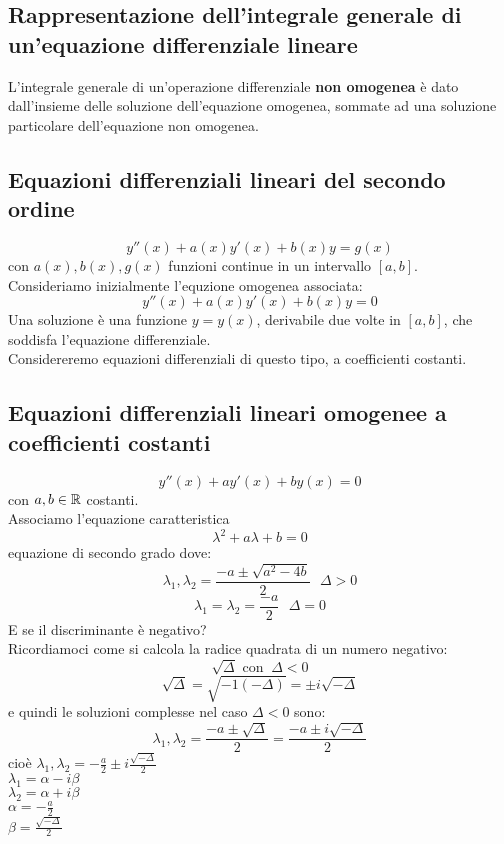 \documentclass[../main.tex]{subfiles}
\begin{document}
\subsection{Rappresentazione dell'integrale generale di un'equazione differenziale lineare}
L'integrale generale di un'operazione differenziale \textbf{non omogenea} è
dato dall'insieme delle soluzione dell'equazione omogenea, sommate ad una
soluzione particolare dell'equazione non omogenea.

\subsection{Equazioni differenziali lineari del secondo ordine}
\[
    y''(x) + a(x)y'(x) + b(x)y = g(x)
\]
con $a(x), b(x), g(x)$ funzioni continue in un intervallo $[a, b]$. \\
Consideriamo inizialmente l'equzione omogenea associata:
\[
    y''(x) + a(x)y'(x) + b(x)y = 0
\]
Una soluzione è una funzione $y = y(x)$, derivabile due volte in $[a, b]$, che
soddisfa l'equazione differenziale.\\ Considereremo equazioni differenziali di
questo tipo, a coefficienti costanti.

\subsection{Equazioni differenziali lineari omogenee a coefficienti costanti}
\[
    y''(x) + ay'(x) + by(x) = 0
\]
con $a, b \in \mathbb{R}$ costanti.\\ Associamo l'equazione caratteristica
\[
    \lambda^2 + a\lambda + b = 0
\]
equazione di secondo grado dove:
\[
    \lambda_1, \lambda_2 = \frac{-a \pm \sqrt{a^2 - 4b}}{2} \ \ \ \Delta > 0
\]
\[
    \lambda_1 = \lambda_2 = \frac{-a}{2} \ \ \ \Delta = 0
\]
E se il discriminante è negativo? \\ Ricordiamoci come si calcola la radice
quadrata di un numero negativo:
\[
    \sqrt{\Delta} \text{ con } \ \Delta < 0
\]
\[
    \sqrt{\Delta} = \sqrt{-1(-\Delta)} = \pm i\sqrt{-\Delta}
\]
e quindi le soluzioni complesse nel caso $\Delta < 0$ sono:
\[
    \lambda_1, \lambda_2 = \frac{-a \pm \sqrt{\Delta}}{2} = \frac{-a\pm i\sqrt{-\Delta}}{2}
\]
cioè $\lambda_1, \lambda_2 = -\frac{a}{2}\pm i \frac{\sqrt{-\Delta}}{2}$\\
$\lambda_1 = \alpha - i\beta$\\ $\lambda_2 = \alpha + i\beta$\\ $\alpha =
    -\frac{a}{2}$\\ $\beta = \frac{\sqrt{-\Delta}}{2}$
\end{document}
